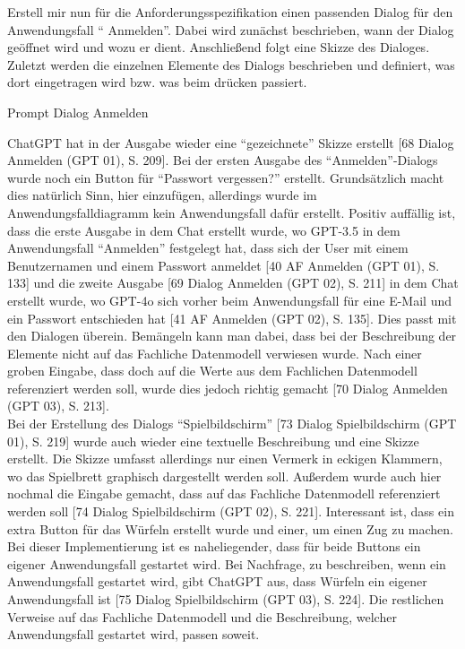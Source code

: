 \begin{prompt}[H]
    \begin{tcolorbox}[colback=gray!20, colframe=gray!20, boxrule=0pt, sharp corners] 
        Erstell mir nun für die Anforderungsspezifikation einen passenden Dialog für den Anwendungsfall ``
    Anmelden''. Dabei wird zunächst 
        beschrieben, wann der Dialog geöffnet wird und wozu er dient. Anschließend folgt eine Skizze des Dialoges. Zuletzt werden die 
        einzelnen Elemente des Dialogs beschrieben und definiert, was dort eingetragen wird bzw. was beim drücken passiert.
        \vfill
    \end{tcolorbox}
    \caption{Prompt Dialog Anmelden}
    \label{Prompt Dialog Anmelden}
\end{prompt}

ChatGPT hat in der Ausgabe wieder eine ``gezeichnete'' Skizze erstellt [68 Dialog Anmelden (GPT 01), S. 209]. Bei der ersten Ausgabe des ``Anmelden''-Dialogs wurde noch ein Button 
für ``Passwort vergessen?'' erstellt. Grundsätzlich macht dies natürlich Sinn, hier einzufügen, allerdings wurde im Anwendungsfalldiagramm 
kein Anwendungsfall dafür erstellt. Positiv auffällig ist, dass die erste Ausgabe in dem Chat erstellt wurde, wo GPT-3.5 
in dem Anwendungsfall ``Anmelden'' festgelegt hat, dass sich der User mit einem Benutzernamen und einem Passwort anmeldet [40 AF Anmelden (GPT 01), S. 133] 
und die zweite Ausgabe [69 Dialog Anmelden (GPT 02), S. 211] in dem Chat erstellt wurde, wo GPT-4o sich vorher beim Anwendungsfall für eine E-Mail und ein 
Passwort entschieden hat [41 AF Anmelden (GPT 02), S. 135]. Dies passt mit den Dialogen überein. Bemängeln kann man dabei, dass bei der Beschreibung der Elemente nicht auf 
das Fachliche Datenmodell verwiesen wurde. Nach einer groben Eingabe, dass doch auf die Werte aus dem Fachlichen Datenmodell referenziert 
werden soll, wurde dies jedoch richtig gemacht [70 Dialog Anmelden (GPT 03), S. 213].\\
Bei der Erstellung des Dialogs ``Spielbildschirm'' [73 Dialog Spielbildschirm (GPT 01), S. 219] wurde auch wieder eine textuelle Beschreibung und eine Skizze erstellt. Die Skizze umfasst 
allerdings nur einen Vermerk in eckigen Klammern, wo das Spielbrett graphisch dargestellt werden soll. Außerdem wurde auch hier nochmal die 
Eingabe gemacht, dass auf das Fachliche Datenmodell referenziert werden soll [74 Dialog Spielbildschirm (GPT 02), S. 221]. Interessant ist, dass ein extra Button für das Würfeln erstellt 
wurde und einer, um einen Zug zu machen. Bei dieser Implementierung ist es naheliegender, dass für beide Buttons ein eigener Anwendungsfall 
gestartet wird. Bei Nachfrage, zu beschreiben, wenn ein Anwendungsfall gestartet wird, gibt ChatGPT aus, dass Würfeln ein eigener 
Anwendungsfall ist [75 Dialog Spielbildschirm (GPT 03), S. 224]. Die restlichen Verweise auf das Fachliche Datenmodell und die Beschreibung, welcher Anwendungsfall gestartet wird, 
passen soweit.

